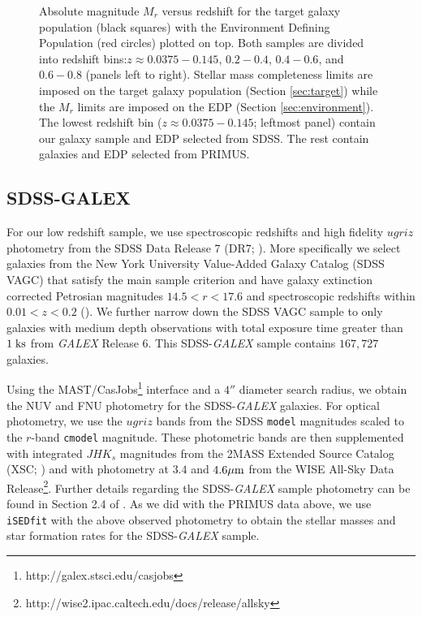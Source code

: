 \documentclass{emulateapj}
\begin{document}
\begin{figure*}
    \begin{center}
        \leavevmode
        \caption{Absolute magnitude $M_{r}$ versus redshift for the target galaxy population (black squares) with the Environment Defining Population (red circles) plotted on top. Both samples are divided into redshift bins:$z \approx 0.0375-0.145$, $0.2-0.4$, $0.4-0.6$, and $0.6-0.8$ (panels left to right). Stellar mass completeness limits are imposed on the target galaxy population (Section \ref{sec:target}) while the $M_{r}$ limits are imposed on the EDP (Section \ref{sec:environment}). The lowest redshift bin ($z \approx 0.0375-0.145$; leftmost panel) contain our galaxy sample and EDP selected from SDSS. The rest contain galaxies and EDP selected from PRIMUS.} \label{fig:targetEDP}
    \end{center}
\end{figure*}

\subsection{SDSS-GALEX} \label{sec:sdss}
For our low redshift sample, we use spectroscopic redshifts and high fidelity $ugriz$ photometry from the SDSS Data Release 7 (DR7; \cite{Abazajian:2009aa}). More specifically we select galaxies from the New York University Value-Added Galaxy Catalog (SDSS VAGC) that satisfy the main sample criterion and have galaxy extinction corrected Petrosian magnitudes $14.5 < r < 17.6$ and spectroscopic redshifts within $0.01 < z < 0.2$ (\cite{Blanton:2005aa}). We further narrow down the SDSS VAGC sample to only galaxies with medium depth observations with total exposure time greater than $1 \; \rm{ks}$ from {\em GALEX} Release 6. This SDSS-{\em GALEX} sample contains $167,727$ galaxies. 

Using the MAST/CasJobs\footnote{http://galex.stsci.edu/casjobs} interface and a $4''$ diameter search radius, we obtain the NUV and FNU photometry for the SDSS-{\em GALEX} galaxies. For optical photometry, we use the $ugriz$ bands from the SDSS \texttt{model} magnitudes scaled to the $r$-band \texttt{cmodel} magnitude. These photometric bands are then supplemented with integrated $JHK_s$ magnitudes from the 2MASS Extended Source Catalog (XSC; \cite{Jarrett:2000aa}) and with photometry at $3.4$ and $4.6 \mu \rm{m}$ from the WISE All-Sky Data Release\footnote{http://wise2.ipac.caltech.edu/docs/release/allsky}. Further details regarding the SDSS-{\em GALEX} sample photometry can be found in Section 2.4 of \cite{Moustakas:2013aa}. As we did with the PRIMUS data above, we use \texttt{iSEDfit} with the above observed photometry to obtain the stellar masses and star formation rates for the SDSS-{\em GALEX} sample. 
\end{document}
